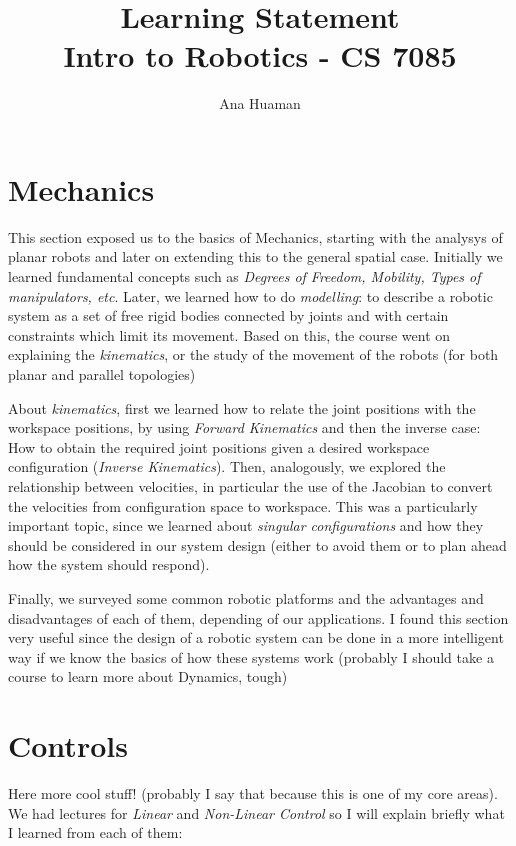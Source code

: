 \documentclass[10pt,a4paper]{article}
\author{Ana Huaman}
\title{Learning Statement \\ Intro to Robotics - CS 7085}
\begin{document}
\maketitle

\section{Mechanics}
This section exposed us to the basics of Mechanics, starting with the analysys of planar robots and later on extending this to the general spatial case. Initially we learned fundamental concepts such as \textit{Degrees of Freedom, Mobility, Types of manipulators, etc}. Later, we learned how to do \textit{modelling}: to describe a robotic system as a set of free rigid bodies connected by joints and with certain constraints which limit its movement. Based on this, the course went on explaining the \textit{kinematics}, or the study of the movement of the robots (for both planar and parallel topologies)
\medskip

About \textit{kinematics}, first we learned how to relate the joint positions with the workspace positions, by using \textit{Forward Kinematics} and then the inverse case: How to obtain the required joint positions given a desired workspace configuration (\textit{Inverse Kinematics}). Then, analogously, we explored the relationship between velocities, in particular the use of the Jacobian to convert the velocities from configuration space to workspace. This was a particularly important topic, since we learned about \textit{singular configurations} and how they should be considered in our system design (either to avoid them or to plan ahead how the system should respond).
\medskip

Finally, we surveyed some common robotic platforms and the advantages and disadvantages of each of them, depending of our applications. I found this section very useful since the design of a robotic system can be done in a more intelligent way if we know the basics of how these systems work (probably I should take a course to learn more about Dynamics, tough)

\section{Controls}
Here more cool stuff! (probably I say that because this is one of my core areas). We had lectures for \textit{Linear} and \textit{Non-Linear Control} so I will explain briefly what I learned from each of them:
\end{document}
